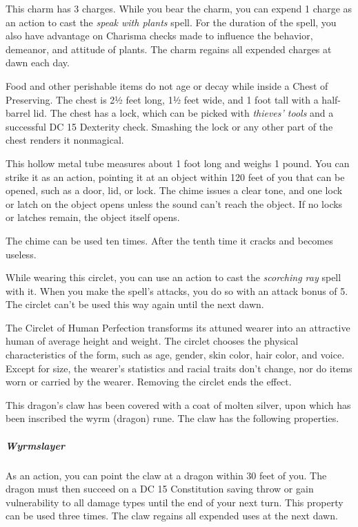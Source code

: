 \documentclass[10pt,a4paper,twoside,bg=print,twocolumn,openany,nodeprecatedcode]{dndbook}
\begin{document}
This charm has 3 charges. While you bear the charm, you can expend 1 charge as an action to cast the \textit{speak with plants} spell. For the duration of the spell, you also have advantage on Charisma checks made to influence the behavior, demeanor, and attitude of plants. The charm regains all expended charges at dawn each day.

Food and other perishable items do not age or decay while inside a Chest of Preserving. The chest is 2½ feet long, 1½ feet wide, and 1 foot tall with a half-barrel lid. The chest has a lock, which can be picked with \textit{thieves' tools} and a successful DC 15 Dexterity check. Smashing the lock or any other part of the chest renders it nonmagical.

This hollow metal tube measures about 1 foot long and weighs 1 pound. You can strike it as an action, pointing it at an object within 120 feet of you that can be opened, such as a door, lid, or lock. The chime issues a clear tone, and one lock or latch on the object opens unless the sound can't reach the object. If no locks or latches remain, the object itself opens.

The chime can be used ten times. After the tenth time it cracks and becomes useless.

While wearing this circlet, you can use an action to cast the \textit{scorching ray} spell with it. When you make the spell's attacks, you do so with an attack bonus of 5. The circlet can't be used this way again until the next dawn.

The Circlet of Human Perfection transforms its attuned wearer into an attractive human of average height and weight. The circlet chooses the physical characteristics of the form, such as age, gender, skin color, hair color, and voice. Except for size, the wearer's statistics and racial traits don't change, nor do items worn or carried by the wearer. Removing the circlet ends the effect.

This dragon's claw has been covered with a coat of molten silver, upon which has been inscribed the wyrm (dragon) rune. The claw has the following properties.

\subparagraph{Wyrmslayer}
As an action, you can point the claw at a dragon within 30 feet of you. The dragon must then succeed on a DC 15 Constitution saving throw or gain vulnerability to all damage types until the end of your next turn. This property can be used three times. The claw regains all expended uses at the next dawn.
\end{document}
